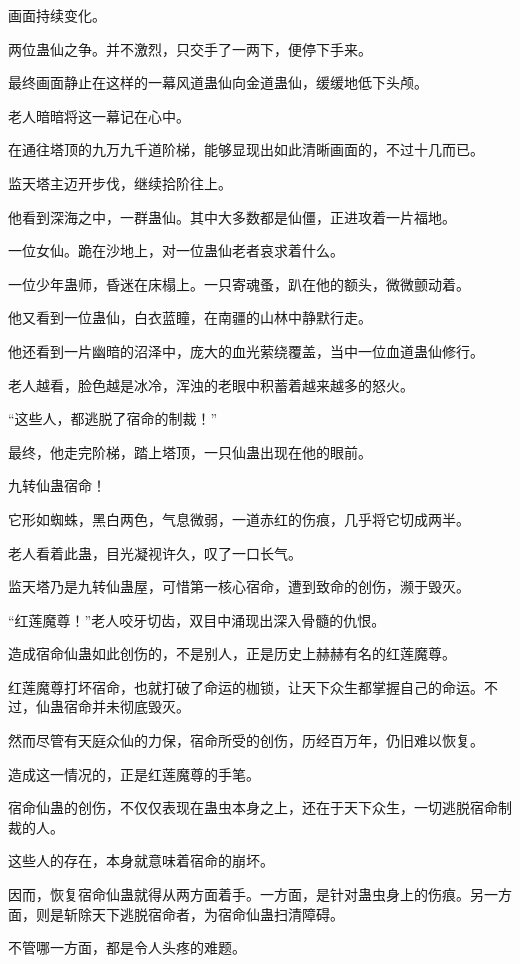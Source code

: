 \begin{this_body}
画面持续变化。

两位蛊仙之争。并不激烈，只交手了一两下，便停下手来。

最终画面静止在这样的一幕风道蛊仙向金道蛊仙，缓缓地低下头颅。

老人暗暗将这一幕记在心中。

在通往塔顶的九万九千道阶梯，能够显现出如此清晰画面的，不过十几而已。

监天塔主迈开步伐，继续拾阶往上。

他看到深海之中，一群蛊仙。其中大多数都是仙僵，正进攻着一片福地。

一位女仙。跪在沙地上，对一位蛊仙老者哀求着什么。

一位少年蛊师，昏迷在床榻上。一只寄魂蚤，趴在他的额头，微微颤动着。

他又看到一位蛊仙，白衣蓝瞳，在南疆的山林中静默行走。

他还看到一片幽暗的沼泽中，庞大的血光萦绕覆盖，当中一位血道蛊仙修行。

老人越看，脸色越是冰冷，浑浊的老眼中积蓄着越来越多的怒火。

“这些人，都逃脱了宿命的制裁！”

最终，他走完阶梯，踏上塔顶，一只仙蛊出现在他的眼前。

九转仙蛊宿命！

它形如蜘蛛，黑白两色，气息微弱，一道赤红的伤痕，几乎将它切成两半。

老人看着此蛊，目光凝视许久，叹了一口长气。

监天塔乃是九转仙蛊屋，可惜第一核心宿命，遭到致命的创伤，濒于毁灭。

“红莲魔尊！”老人咬牙切齿，双目中涌现出深入骨髓的仇恨。

造成宿命仙蛊如此创伤的，不是别人，正是历史上赫赫有名的红莲魔尊。

红莲魔尊打坏宿命，也就打破了命运的枷锁，让天下众生都掌握自己的命运。不过，仙蛊宿命并未彻底毁灭。

然而尽管有天庭众仙的力保，宿命所受的创伤，历经百万年，仍旧难以恢复。

造成这一情况的，正是红莲魔尊的手笔。

宿命仙蛊的创伤，不仅仅表现在蛊虫本身之上，还在于天下众生，一切逃脱宿命制裁的人。

这些人的存在，本身就意味着宿命的崩坏。

因而，恢复宿命仙蛊就得从两方面着手。一方面，是针对蛊虫身上的伤痕。另一方面，则是斩除天下逃脱宿命者，为宿命仙蛊扫清障碍。

不管哪一方面，都是令人头疼的难题。


\end{this_body}
